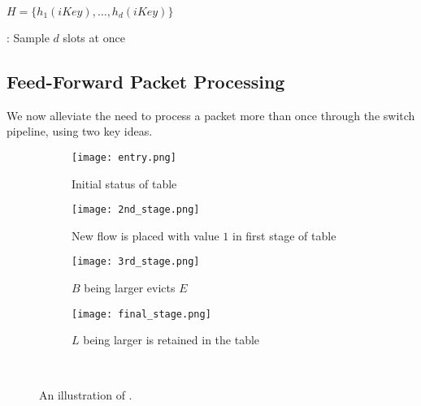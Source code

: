 \begin{algorithm}
\DontPrintSemicolon %
\;


$H = \{h_1(iKey), \ldots, h_d(iKey)\}$\;

\caption{\Baseline: Sample $d$ slots at once}
\label{algo:Baseline}
\end{algorithm}

\subsection{Feed-Forward Packet Processing}
\label{sec:feed-forward}
We now alleviate the need to process a packet more than once through the switch
pipeline, using two key ideas.

\begin{figure*}[h] 
  \begin{subfigure}[b]{0.45\linewidth}
    \centering
    \texttt{[image: entry.png]} 
    \caption{Initial status of table} 
    \label{alg:a} 
    \vspace{4ex}
  \end{subfigure}%
  \begin{subfigure}[b]{0.45\linewidth}
    \centering
    \texttt{[image: 2nd\_stage.png]} 
    \caption{New flow is placed with value $1$ in first stage of table} 
    \label{alg:b} 
    \vspace{4ex}
  \end{subfigure} 
  \begin{subfigure}[b]{0.45\linewidth}
    \centering
    \texttt{[image: 3rd\_stage.png]} 
    \caption{$B$ being larger evicts $E$} 
    \label{alg:c} 
  \end{subfigure}%
  \begin{subfigure}[b]{0.45\linewidth}
    \centering
    \texttt{[image: final\_stage.png]} 
    \caption{$L$ being larger is retained in the table} 
    \label{alg:d} 
  \end{subfigure} 
  \\
  \caption{An illustration of \TheSystem.}
  \label{fig:HashPipe} 
\end{figure*}

